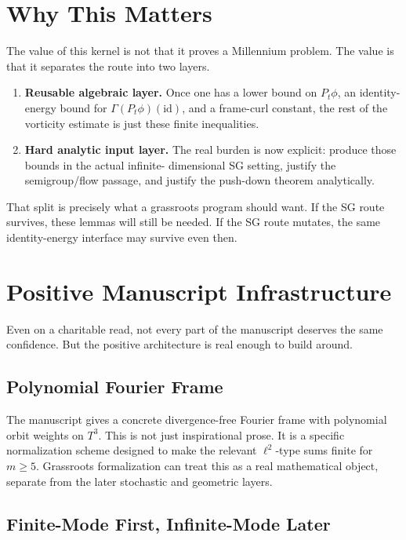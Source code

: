 \documentclass[11pt]{article}
\theoremstyle{remark}
\begin{document}
\section{Why This Matters}

The value of this kernel is not that it proves a Millennium problem.  The value
is that it separates the route into two layers.

\begin{enumerate}[leftmargin=1.5em]
  \item \textbf{Reusable algebraic layer.}
  Once one has a lower bound on \(P_t \phi\), an identity-energy bound for
  \(\Gamma(P_t\phi)(\mathrm{id})\), and a frame-curl constant, the rest of the
  vorticity estimate is just these finite inequalities.
  \item \textbf{Hard analytic input layer.}
  The real burden is now explicit: produce those bounds in the actual infinite-
  dimensional SG setting, justify the semigroup/flow passage, and justify the
  push-down theorem analytically.
\end{enumerate}

That split is precisely what a grassroots program should want.  If the SG route
survives, these lemmas will still be needed.  If the SG route mutates, the same
identity-energy interface may survive even then.

\section{Positive Manuscript Infrastructure}

Even on a charitable read, not every part of the manuscript deserves the same
confidence.  But the positive architecture is real enough to build around.

\subsection{Polynomial Fourier Frame}

The manuscript gives a concrete divergence-free Fourier frame with polynomial
orbit weights on \(T^3\).  This is not just inspirational prose.  It is a
specific normalization scheme designed to make the relevant \(\ell^2\)-type
sums finite for \(m \ge 5\).  Grassroots formalization can treat this as a real
mathematical object, separate from the later stochastic and geometric layers.

\subsection{Finite-Mode First, Infinite-Mode Later}
\end{document}
